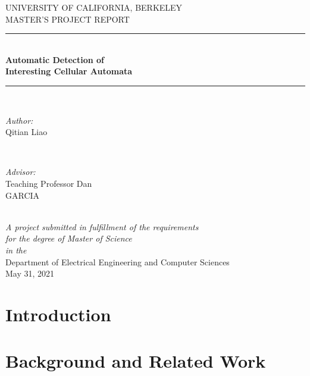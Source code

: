 \documentclass[12pt]{article}
\begin{document}
\begin{titlepage}
\newcommand{\HRule}{\rule{\linewidth}{0.5mm}} %

\center %
 

\textsc{\large UNIVERSITY OF CALIFORNIA, BERKELEY}\\[1.5cm] %
\textsc{\large MASTER'S PROJECT REPORT}\\[0.5cm] %

\HRule \\[0.4cm]
{ \huge \bfseries Automatic Detection of \\[0.7cm] Interesting Cellular Automata }\\[0.03cm] %
\HRule \\[1.5cm]

\begin{minipage}{0.4\textwidth}
\begin{flushleft} \large
\emph{Author:}\\
Qitian Liao %
\end{flushleft}
\end{minipage}
~
\begin{minipage}{0.4\textwidth}
\begin{flushright} \large
\emph{Advisor:} \\
Teaching Professor Dan \\ GARCIA %
\end{flushright}
\end{minipage}\\[3.5cm]

{\emph{ A project submitted in fulfillment of the requirements \\[0.3cm]for the degree of Master of Science\\[0.5cm] in the} \\[0.5cm] Department of Electrical Engineering and Computer Sciences}\\
[2cm]%
May 31, 2021

 

\vfill %

\end{titlepage}

\newpage
\tableofcontents

\newpage
\section{ Introduction}





\newpage
\section{\LARGE Background and Related Work}
\end{document}
